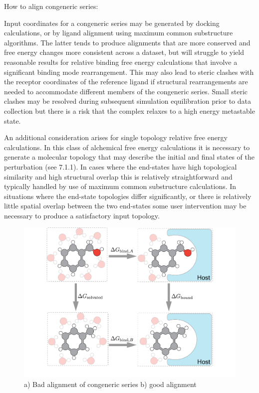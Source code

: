 \documentclass[9pt,bestpractices]{livecoms}
\begin{document}
How to align congeneric series:

Input coordinates for a congeneric series may be generated by docking calculations, or by ligand alignment using maximum common substructure algorithms. The latter tends to produce alignments that are more conserved and free energy changes more consistent across a dataset, but will struggle to yield reasonable results for relative binding free energy calculations that involve a significant binding mode rearrangement. This may also lead to steric clashes with the receptor coordinates of the reference ligand if structural rearrangements are needed to accommodate different members of the congeneric series. Small steric clashes may be resolved during subsequent simulation equilibration prior to data collection but there is a risk that the complex relaxes to a high energy metastable state. 

An additional consideration arises for single topology relative free energy calculations. In this class of alchemical free energy calculations it is necessary to generate a molecular topology that may describe the initial and final states of the perturbation (see 7.1.1). In cases where the end-states have high topological similarity and high structural overlap this is relatively straightforward and typically handled by use of maximum common substructure calculations. In situations where the end-state topologies differ significantly, or there is relatively little spatial overlap between the two end-states some user intervention may be necessary to produce a satisfactory input topology.

\begin{figure}
    \includegraphics[width=0.95\linewidth]{paper/figures/fig2/Fig2.pdf}
    \caption{a) Bad alignment of congeneric series b) good alignment}
    \label{fig:not-sure-what-this-is}
\end{figure}
\end{document}
